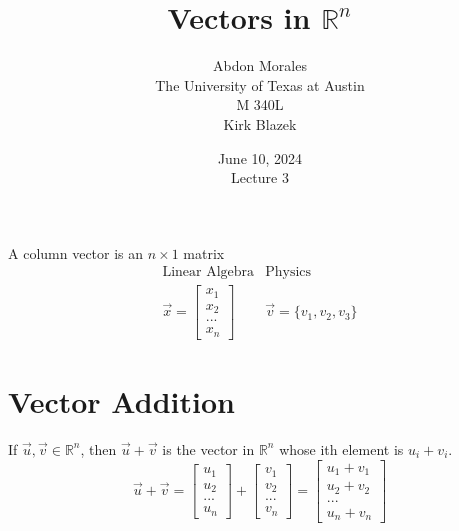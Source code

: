 \documentclass[11pt]{article} %
\title{Vectors in $\mathbb{R}^n$}
\author{Abdon Morales \\ The University of Texas at Austin \\ M 340L \\ Kirk Blazek}
\date{June 10, 2024 \\ Lecture 3}
\begin{document}
\maketitle

A column vector is an $n \times 1$ matrix
\begin{gather*}
\text{Linear Algebra} & \text{Physics}\\
\vec{x}=
\begin{bmatrix}
x_1\\
x_2\\
...\\
x_n
\end{bmatrix} & \vec{v} = \{ v_1, v_2, v_3 \}
\end{gather*}
\section*{Vector Addition}
If $\vec{u}, \vec{v} \in \mathbb{R}^n$, then $\vec{u} + \vec{v}$ is the vector in $\mathbb{R}^n$ whose ith element is $u_i + v_i$.
\begin{equation}
\vec{u} + \vec{v} =
\begin{bmatrix}
u_1\\
u_2\\
...\\
u_n
\end{bmatrix} +
\begin{bmatrix}
v_1\\
v_2\\
...\\
v_n
\end{bmatrix} =
\begin{bmatrix}
u_1 + v_1\\
u_2 + v_2\\
...\\
u_n + v_n
\end{bmatrix}
\end{equation}
\end{document}
